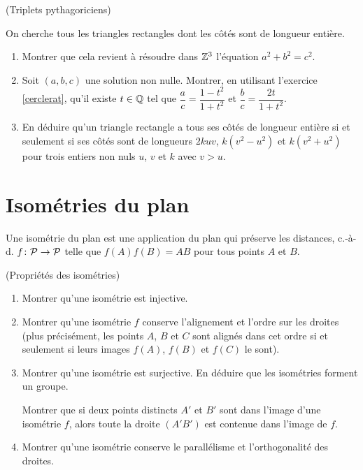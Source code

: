 \documentclass[a4paper,11pt,reqno]{amsart}
\begin{document}
\begin{exo} (Triplets pythagoriciens)

  On cherche tous les triangles rectangles dont les côtés sont de longueur entière.
  \begin{enumerate}
    \item Montrer que cela revient à résoudre dans $\mathbb{Z}^3$ l'équation $a^2+b^2=c^2$.
    \item Soit $(a,b,c)$ une solution non nulle. Montrer, en utilisant l'exercice \ref{cerclerat}, qu'il  existe $t \in \mathbb{Q}$ tel que $\dfrac{a}{c}= \dfrac{1-t^2}{1+t^2}$\; et\; $\dfrac{b}{c}= \dfrac{2t}{1+t^2}$.
    \item En déduire qu'un triangle rectangle a tous ses côtés de longueur entière si et seulement si ses côtés sont de longueurs $2kuv$, $k(v^2-u^2)$ et $k(v^2+u^2)$ pour trois entiers non nuls $u$, $v$ et $k$ avec $v>u$.
  \end{enumerate}
\end{exo}

\section{Isométries du plan}

\begin{convention}
  Une isométrie du plan est une application du plan qui préserve les distances, c.-à-d. $f \colon \mathcal{P} \to \mathcal{P}$ telle que $f(A)f(B)=AB$ pour tous points $A$ et $B$.
\end{convention}

\begin{exo} (Propriétés des isométries)

\begin{enumerate}
  \item Montrer qu'une isométrie est injective.
  \item Montrer qu'une isométrie $f$ conserve l'alignement et l'ordre sur les droites (plus précisément, les points $A$, $B$ et $C$ sont alignés dans cet ordre si et seulement si leurs images $f(A)$, $f(B)$ et $f(C)$ le sont).
  \item Montrer qu'une isométrie est surjective. En déduire que les isométries forment un groupe.\\
    \begin{indication}
      Montrer que si deux points distincts $A'$ et $B'$ sont dans l'image d'une isométrie $f$, alors toute la droite $(A'B')$ est contenue dans l'image de $f$.
    \end{indication}
  \item Montrer qu'une isométrie conserve le parallélisme et l'orthogonalité des droites.
\end{enumerate}
\end{exo}
\end{document}
